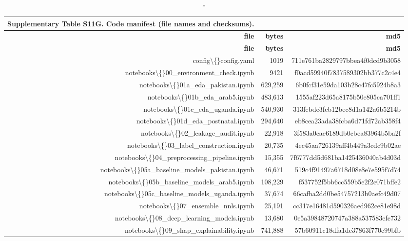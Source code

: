 \documentclass[10pt]{article}
\begin{document}
\tiny
\setlength{\tabcolsep}{2pt}
\begin{longtable}{rrr}
\caption*{\textbf{Supplementary Table S11G.} Code manifest (file names and checksums).}\\
\toprule
\textbf{file} & \textbf{bytes} & \textbf{md5} \\
\midrule
\endfirsthead
\toprule
\textbf{file} & \textbf{bytes} & \textbf{md5} \\
\midrule
\endhead
\bottomrule
\endfoot
config\textbackslash\{\}config.yaml & 1019 & 711e761ba2829797bbea4f0dcd9b3058 \\
notebooks\textbackslash\{\}00\_environment\_check.ipynb & 9421 & f0acd59940f7837589302bb377c2c4e4 \\
notebooks\textbackslash\{\}01a\_eda\_pakistan.ipynb & 629{,}259 & 6b0fcf31e59da103b28c47fc5924b8a3 \\
notebooks\textbackslash\{\}01b\_eda\_arab5.ipynb & 483{,}613 & 1555af223d65a8175b50e805ca701ff1 \\
notebooks\textbackslash\{\}01c\_eda\_uganda.ipynb & 540{,}930 & 313febde3feb12bec8d1a142a6b5214b \\
notebooks\textbackslash\{\}01d\_eda\_postnatal.ipynb & 294{,}640 & eb8cea23ada38fcba6d71fd72ab358f4 \\
notebooks\textbackslash\{\}02\_leakage\_audit.ipynb & 22{,}918 & 3f583a0cae6189db0cbea83964b5ba2f \\
notebooks\textbackslash\{\}03\_label\_construction.ipynb & 20{,}735 & 4ec45aa726139aff4b449a3cdc9b02ae \\
notebooks\textbackslash\{\}04\_preprocessing\_pipeline.ipynb & 15{,}355 & 7f6777dd5d681ba1425436040ab4d03d \\
notebooks\textbackslash\{\}05a\_baseline\_models\_pakistan.ipynb & 46{,}671 & 519c4f91497a6718d08e8e7e595f7d74 \\
notebooks\textbackslash\{\}05b\_baseline\_models\_arab5.ipynb & 108{,}229 & f537752f5bb6cc559b5e2f2c071bffe2 \\
notebooks\textbackslash\{\}05c\_baseline\_models\_uganda.ipynb & 37{,}674 & 66cafba2dd0be54757213b0aefc49d07 \\
notebooks\textbackslash\{\}07\_ensemble\_nnls.ipynb & 25{,}191 & cc317e16481d590326aed962ce81e98d \\
notebooks\textbackslash\{\}08\_deep\_learning\_models.ipynb & 13{,}680 & 0e5a39848720747a388a537583efc732 \\
notebooks\textbackslash\{\}09\_shap\_explainability.ipynb & 741{,}888 & 57b60911c18dfa1dc37863f770c99bfb \\

\end{longtable}
\end{document}

